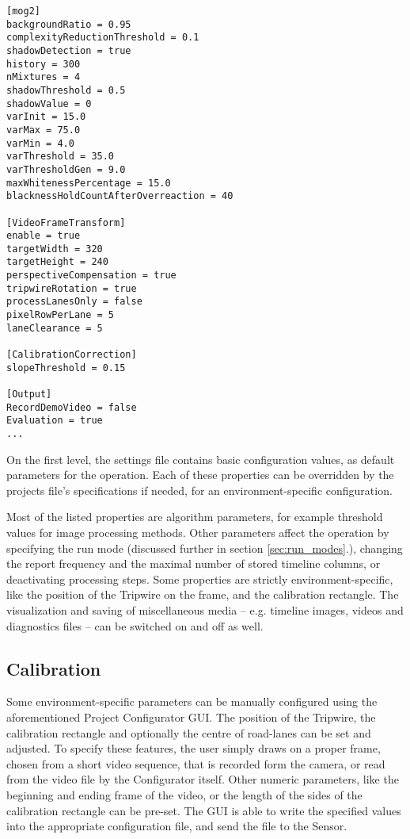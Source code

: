 \begin{lstlisting}[frame=single,float=!ht,caption={Part of a configuration file. The features are organized into groups, called section and presented as key--value pairs.},label=lst:config_file]
[mog2]
backgroundRatio = 0.95
complexityReductionThreshold = 0.1
shadowDetection = true
history = 300
nMixtures = 4
shadowThreshold = 0.5
shadowValue = 0
varInit = 15.0
varMax = 75.0
varMin = 4.0
varThreshold = 35.0
varThresholdGen = 9.0
maxWhitenessPercentage = 15.0
blacknessHoldCountAfterOverreaction = 40

[VideoFrameTransform]
enable = true
targetWidth = 320
targetHeight = 240
perspectiveCompensation = true
tripwireRotation = true
processLanesOnly = false
pixelRowPerLane = 5
laneClearance = 5

[CalibrationCorrection]
slopeThreshold = 0.15

[Output]
RecordDemoVideo = false
Evaluation = true
...
\end{lstlisting}

On the first level, the settings file contains basic configuration values, as default parameters for the operation.
Each of these properties can be overridden by the projects file's specifications if needed, for an environment-specific configuration.

Most of the listed properties are algorithm parameters, for example threshold values for image processing methods.
Other parameters affect the operation by specifying the run mode (discussed further in section \ref{sec:run_modes}.), changing the report frequency and the maximal number of stored timeline columns, or deactivating processing steps.
Some properties are strictly environment-specific, like the position of the Tripwire on the frame, and the calibration rectangle.
The visualization and saving of miscellaneous media -- e.g. timeline images, videos and diagnostics files -- can be switched on and off as well.

\subsection{Calibration}\label{chap:calibration}
Some environment-specific parameters can be manually configured using the aforementioned Project Configurator GUI.
The position of the Tripwire, the calibration rectangle and optionally the centre of road-lanes can be set and adjusted.
To specify these features, the user simply draws on a proper frame, chosen from a short video sequence, that is recorded form the camera, or read from the video file by the Configurator itself.
Other numeric parameters, like the beginning and ending frame of the video, or the length of the sides of the calibration rectangle can be pre-set.
The GUI is able to write the specified values into the appropriate configuration file, and send the file to the Sensor. 

